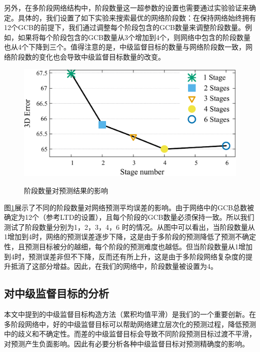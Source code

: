 另外，在多阶段网络结构中，阶段数量这一超参数的设置也需要通过实验验证来确定。具体的，我们设置了如下实验来搜索最优的网络阶段数：在保持网络始终拥有12个GCB的前提下，我们通过调整每个阶段包含的GCB数量来调整阶段数量。例如，如果将每个阶段包含的GCB数量从3个增加到4个，则网络中包含的阶段数量也从4个下降到三个。值得注意的是，中级监督目标的数量与网络阶段数一致，网络阶段数的变化也会导致中级监督目标数量的改变。
\begin{figure}[ht]
    \centering
    \includegraphics[width=0.6\columnwidth]{FigMa/smooth_stage.pdf} \\
    \caption{阶段数量对预测结果的影响}
    \label{fig:ablation-stage-number}
\end{figure}

图\ref{fig:ablation-stage-number}展示了不同的阶段数量对网络预测平均误差的影响。由于网络中的GCB总数被确定为12个（参考LTD的设置），且每个阶段的GCB数量必须保持一致。所以我们测试了阶段数量分别为1，2，3，4，6 时的情况。从图中可以看出，当阶段数量从1增加到4时，网络的预测误差逐步下降，这是由于多阶段的预测降低了预测不确定性，且预测目标被分的越细，每个阶段的预测难度也越低。但当阶段数量从1增加到4时，预测误差非但不下降，反而还有所上升，这是由于多阶段网络复杂度的提升抵消了这部分增益。因此，在我们的网络中，阶段数量被设置为4。

\subsection{对中级监督目标的分析}
本文中提到的中级监督目标构造方法（累积均值平滑）是我们的一个重要创新。在多阶段网络中，好的中级监督目标可以帮助网络建立层次化的预测过程，降低预测中的歧义和不确定性。而差的中级监督目标会导致不同阶段预测目标过渡不平滑，对预测产生负面影响。因此有必要分析各种中级监督目标对预测精确度的影响。

